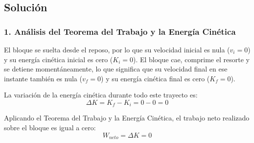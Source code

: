 \documentclass[12pt, a4paper]{article}
\begin{document}
\subsection*{Solución}

\subsubsection*{1. Análisis del Teorema del Trabajo y la Energía Cinética}
El bloque se suelta desde el reposo, por lo que su velocidad inicial es nula ($v_i = 0$) y su energía cinética inicial es cero ($K_i = 0$). El bloque cae, comprime el resorte y se detiene momentáneamente, lo que significa que su velocidad final en ese instante también es nula ($v_f = 0$) y su energía cinética final es cero ($K_f = 0$).

La variación de la energía cinética durante todo este trayecto es:
$$\Delta K = K_f - K_i = 0 - 0 = 0$$

Aplicando el Teorema del Trabajo y la Energía Cinética, el trabajo neto realizado sobre el bloque es igual a cero:
$$W_{neto} = \Delta K = 0$$
\end{document}
